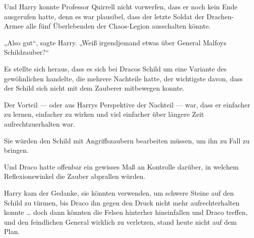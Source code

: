 Und Harry konnte Professor Quirrell nicht vorwerfen, dass er noch kein Ende ausgerufen hatte, denn es war plausibel, dass der letzte Soldat der Drachen-Armee alle fünf Überlebenden der Chaos-Legion ausschalten könnte.

„Also gut“, sagte Harry.
„Weiß irgendjemand etwas über General Malfoys Schildzauber?“

Es stellte sich heraus, dass es sich bei Dracos Schild um eine Variante des gewöhnlichen  handelte, die mehrere Nachteile hatte, der wichtigste davon, dass der Schild sich nicht mit dem Zauberer mitbewegen konnte.

Der Vorteil — oder aus Harrys Perspektive der Nachteil — war, dass er einfacher zu lernen, einfacher zu wirken und viel einfacher über längere Zeit aufrechtzuerhalten war.

Sie würden den Schild mit Angriffszaubern bearbeiten müssen, um ihn zu Fall zu bringen.

Und Draco hatte offenbar ein gewisses Maß an Kontrolle darüber, in welchem Reflexionswinkel die Zauber abprallen würden.

Harry kam der Gedanke, sie könnten  verwenden, um schwere Steine auf den Schild zu türmen, bis Draco ihn gegen den Druck nicht mehr aufrechterhalten konnte … doch dann könnten die Felsen hinterher hineinfallen und Draco treffen, und den feindlichen General wirklich zu verletzen, stand heute nicht auf dem Plan.

